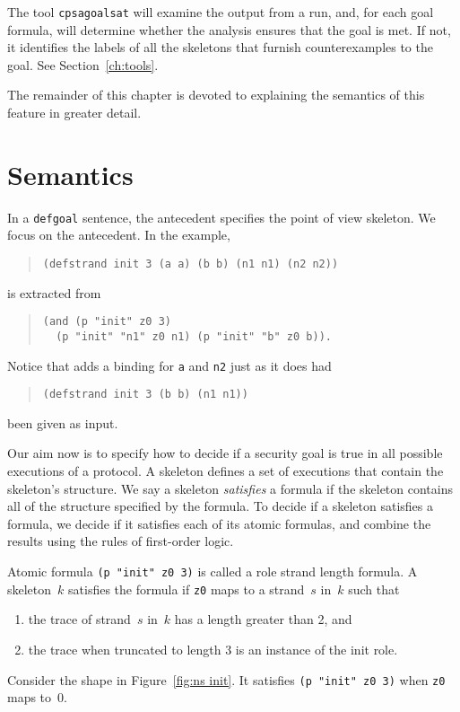 The tool \texttt{cpsagoalsat} will examine the output from a {\cpsa}
run, and, for each goal formula, will determine whether the analysis
ensures that the goal is met.  If not, it identifies the labels of all
the skeletons that furnish counterexamples to the goal.  See
Section~\ref{ch:tools}.

The remainder of this chapter is devoted to explaining the semantics
of this feature in greater detail.

\section{Semantics}\label{sec:semantics}

In a \texttt{defgoal} sentence, the antecedent specifies the point of
view skeleton.  We focus on the antecedent.  In the example,

\begin{quote}
\begin{verbatim}
(defstrand init 3 (a a) (b b) (n1 n1) (n2 n2))
\end{verbatim}
\end{quote}
is extracted from
\begin{quote}
\begin{verbatim}
(and (p "init" z0 3)
  (p "init" "n1" z0 n1) (p "init" "b" z0 b)).
\end{verbatim}
\end{quote}
Notice that {\cpsa} adds a binding for \texttt{a} and \texttt{n2} just
as it does had
\begin{quote}
\begin{verbatim}
(defstrand init 3 (b b) (n1 n1))
\end{verbatim}
\end{quote}
been given as input.

Our aim now is to specify how to decide if a security goal is true in
all possible executions of a protocol.  A skeleton defines a set of
executions that contain the skeleton's structure.  We say a skeleton
\emph{satisfies} a formula if the skeleton contains all of the
structure specified by the formula.  To decide if a skeleton
satisfies a formula, we decide if it satisfies each of its atomic
formulas, and combine the results using the rules of first-order
logic.

Atomic formula \texttt{(p "init" z0 3)} is called a role strand length
formula.  A skeleton~$k$ satisfies the formula if \texttt{z0} maps to
a strand~$s$ in~$k$ such that
\begin{enumerate}
\item the trace of strand~$s$ in~$k$ has a length greater than 2, and
\item the trace when truncated to length 3 is an instance of the init
  role.
\end{enumerate}
Consider the shape in Figure~\ref{fig:ns init}.  It satisfies
\texttt{(p "init" z0 3)} when \texttt{z0} maps to~0.


